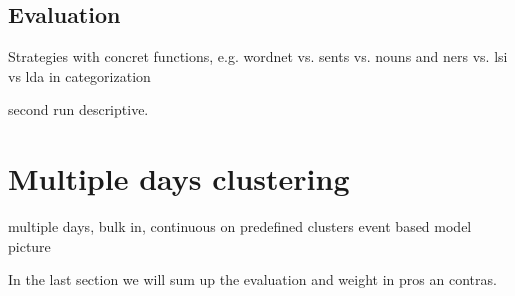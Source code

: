   \subsection{Evaluation}
  Strategies with concret functions, e.g. wordnet vs. sents vs. nouns and ners vs. lsi vs lda in categorization

  second run descriptive.

\section{Multiple days clustering}
  
  multiple days, bulk in,
  continuous on predefined clusters
  event based model picture

In the last section we will sum up the evaluation and weight in pros an contras.

